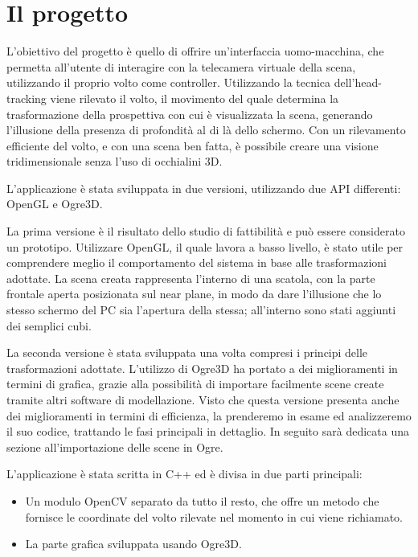 \chapter{Il progetto}

L'obiettivo del progetto è quello di offrire un'interfaccia uomo-macchina, che permetta all'utente di interagire con la telecamera virtuale della scena, utilizzando il proprio volto come controller. Utilizzando la tecnica dell'head-tracking viene rilevato il volto, il  movimento del quale determina la trasformazione della prospettiva con cui è visualizzata la scena, generando l'illusione della presenza di profondità al di là dello schermo. Con un rilevamento efficiente del volto, e con una scena ben fatta, è possibile creare una visione tridimensionale senza l'uso di occhialini 3D.

L'applicazione è stata sviluppata in due versioni, utilizzando due API differenti: OpenGL e Ogre3D.

La prima versione è il risultato dello studio di fattibilità e può essere considerato un prototipo.
Utilizzare OpenGL, il quale lavora a basso livello, è stato utile per comprendere meglio il comportamento del sistema in base alle trasformazioni adottate. La scena creata rappresenta l'interno di una scatola, con la parte frontale aperta posizionata sul near plane, in modo da dare l'illusione che lo stesso schermo del PC sia l'apertura della stessa; all'interno sono stati aggiunti dei semplici cubi.

La seconda versione è stata sviluppata una volta compresi i principi delle trasformazioni adottate. L'utilizzo di Ogre3D ha portato a dei miglioramenti in termini di grafica, grazie alla possibilità di importare facilmente scene create tramite altri software di modellazione. Visto che questa versione presenta anche dei miglioramenti in termini di efficienza, la prenderemo in esame ed analizzeremo il suo codice, trattando le fasi principali in dettaglio.
In seguito sarà dedicata una sezione all'importazione delle scene in Ogre.


L'applicazione è stata scritta in C++ ed è divisa in due parti principali:
\begin{itemize}
\item Un modulo OpenCV separato da tutto il resto, che offre un metodo che fornisce le coordinate del volto rilevate nel momento in cui viene richiamato.
\item La parte grafica sviluppata usando Ogre3D.
\end{itemize}


